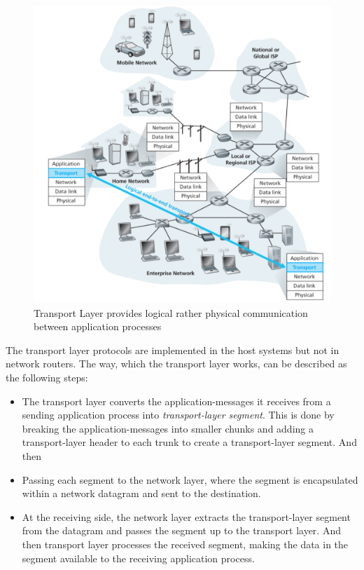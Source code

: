 \documentclass[a4paper, 11pt]{article}
\begin{document}
\begin{figure}[h]
\includegraphics[scale=0.6]{transport-layer.png}
\caption{Transport Layer provides logical rather physical communication between application processes}
\end{figure}

The transport layer protocols are implemented in the host systems but not in network routers. The way, which the transport layer works, can be described as the following steps:\\

\begin{itemize}
\item The transport layer converts the application-messages it receives from a sending application process into \textit{transport-layer segment}. This is done by breaking the application-messages into smaller chunks and adding a transport-layer header to each trunk to create a transport-layer segment. And then
\item Passing each segment to the network layer, where the segment is encapsulated within a network datagram and sent to the destination.
\item At the receiving side, the network layer extracts the transport-layer segment from the datagram and passes the segment up to the transport layer. And then transport layer processes the received segment, making the data in the segment available to the receiving application process.
\end{itemize}
\end{document}
